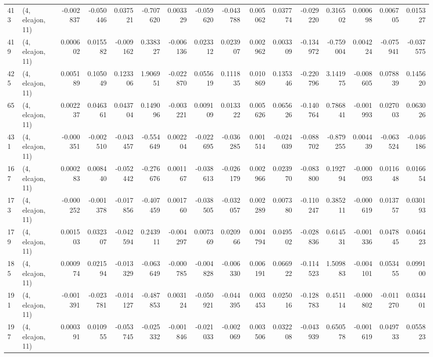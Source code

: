 \begin{tabular}{llrrrrrrrrrrrrrr}
413 &  (4, elcajon, 11) &  -0.002837 & -0.050446 &  0.037521 &  -0.707620 &  0.003329 &  -0.059620 & -0.043788 &  0.005062 &  0.037774 & -0.029220 &     0.316502 &   0.000698 &   0.006705 &   0.015327 \\
419 &  (4, elcajon, 11) &   0.000602 &  0.015582 & -0.009162 &   0.338327 & -0.006136 &   0.023312 &  0.023907 &  0.002962 &  0.003309 & -0.134972 &    -0.759004 &   0.004224 &  -0.075941 &  -0.037575 \\
425 &  (4, elcajon, 11) &   0.005189 &  0.105049 &  0.123306 &   1.906951 & -0.022870 &   0.055619 &  0.111835 &  0.010869 &  0.135346 & -0.220796 &     3.141975 &  -0.008605 &   0.078839 &   0.145620 \\
65  &  (4, elcajon, 11) &   0.002237 &  0.046361 &  0.043704 &   0.149096 & -0.003221 &   0.009109 &  0.013322 &  0.005626 &  0.065626 & -0.140764 &     0.786841 &  -0.001993 &   0.027003 &   0.063026 \\
431 &  (4, elcajon, 11) &  -0.000351 & -0.002510 & -0.043457 &  -0.554649 &  0.002204 &  -0.022695 & -0.036285 &  0.001514 & -0.024039 & -0.088702 &    -0.879255 &   0.004439 &  -0.063524 &  -0.046186 \\
167 &  (4, elcajon, 11) &   0.000283 &  0.008440 & -0.052442 &  -0.276676 &  0.001167 &  -0.038613 & -0.026179 &  0.002966 &  0.023970 & -0.083800 &     0.192794 &  -0.000093 &   0.011648 &   0.016654 \\
173 &  (4, elcajon, 11) &  -0.000252 & -0.001378 & -0.017856 &  -0.407459 &  0.001760 &  -0.038505 & -0.032057 &  0.002289 &  0.007380 & -0.110247 &     0.385211 &  -0.000619 &   0.013757 &   0.030193 \\
179 &  (4, elcajon, 11) &   0.001503 &  0.032307 & -0.042594 &   0.243911 & -0.004297 &   0.007369 &  0.020966 &  0.004794 &  0.049502 & -0.028836 &     0.614531 &  -0.001336 &   0.047845 &   0.046423 \\
185 &  (4, elcajon, 11) &   0.000974 &  0.021594 & -0.013329 &  -0.063649 & -0.000785 &  -0.004828 & -0.006330 &  0.006191 &  0.066922 & -0.114523 &     1.509883 &  -0.004101 &   0.053455 &   0.099100 \\
191 &  (4, elcajon, 11) &  -0.001391 & -0.023781 & -0.014127 &  -0.487853 &  0.003124 &  -0.050921 & -0.044395 &  0.003453 &  0.025016 & -0.128783 &     0.451114 &  -0.000802 &  -0.011270 &   0.034401 \\
197 &  (4, elcajon, 11) &   0.000391 &  0.010955 & -0.053745 &  -0.025332 & -0.001846 &  -0.021033 & -0.002069 &  0.003506 &  0.032208 & -0.043939 &     0.650578 &  -0.001619 &   0.049733 &   0.055823 \\

\end{tabular}
